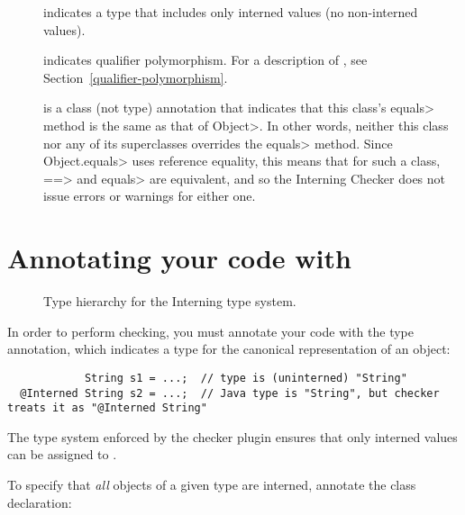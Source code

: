 \begin{description}

\item[]
  indicates a type that includes only interned values (no non-interned
  values).

\item[]
  indicates qualifier polymorphism.  For a description of
  , see
  Section~\ref{qualifier-polymorphism}.

\item[]
  is a class (not type) annotation that indicates that this class's
  \<equals> method is the same as that of \<Object>.  In other words,
  neither this class nor any of its superclasses overrides the \<equals>
  method.  Since \<Object.equals> uses reference equality, this means that
  for such a class, \<==> and \<equals> are equivalent, and so the
  Interning Checker does not issue errors or warnings for either one.

\end{description}


\section{Annotating your code with \label{annotating-with-interned}}

\begin{figure}
\caption{Type hierarchy for the Interning type system.}
\label{fig-interning-hierarchy}
\end{figure}

In order to perform checking, you must annotate your code with the 
type annotation, which indicates a type for the canonical representation of an
object:

\begin{Verbatim}
            String s1 = ...;  // type is (uninterned) "String"
  @Interned String s2 = ...;  // Java type is "String", but checker treats it as "@Interned String"
\end{Verbatim}

The type system enforced by the checker plugin ensures that only interned
values can be assigned to .

To specify that \emph{all} objects of a given type are interned, annotate the
class declaration:

